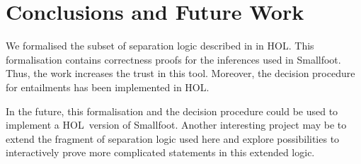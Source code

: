 \documentclass{scrartcl}
\theoremstyle{definition}
\newcommand{\smallfoot}{{\textsf{Smallfoot}}}
\newcommand{\HOL}{{\textsc{HOL}}}
\begin{document}
\section{Conclusions and Future Work}

We formalised the subset of separation logic described in
\cite{berdine05symbolic} in \HOL. This formalisation contains correctness
proofs for the inferences used in \smallfoot. Thus, the work increases the
trust in this tool. Moreover, the decision procedure for entailments has been
implemented in \HOL.

In the future, this formalisation and the decision procedure could be used to
implement a \HOL\ version of \smallfoot. Another interesting project may be to
extend the fragment of separation logic used here and explore possibilities to
interactively prove more complicated statements in this extended logic.


\bigskip
\bigskip


\end{document}
